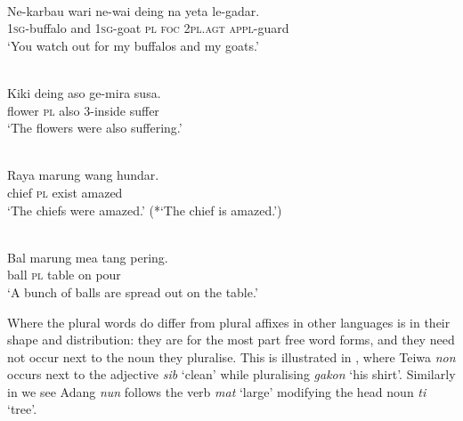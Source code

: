 \ea%
\label{ex:9:4}
 \\
\gll Ne-karbau wari ne-wai deing na yeta le-gadar.{\footnotemark}\\
  \textsc{1sg}\textsc{-}buffalo and \textsc{1sg-}goat \textsc{pl} \textsc{foc} \textsc{2pl.agt} \textsc{appl-}guard\\
\glt `You watch out for my buffalos and my goats.' 
\z
{}







\ea%
\label{ex:9:5}
 \\
\gll Kiki deing aso ge-mira susa. \\
  flower \textsc{pl} also 3-inside suffer  \\
\glt `The flowers were also suffering.'
 \z








\ea%
\label{ex:9:6}
 \\
\gll  Raya marung wang hundar. \\
   chief \textsc{pl} exist amazed  \\
\glt `The chiefs were amazed.' (*`The chief is amazed.')
\z







\ea%
\label{ex:9:7}
 \\
\gll Bal  marung mea tang pering.  \\
  ball \textsc{pl} table on pour   \\
\glt `A bunch of balls are spread out on the table.'
\z







Where the plural words do differ from plural affixes in other languages is in their shape and distribution: they are for the most part free word forms, and they need not occur next to the noun they pluralise. This is illustrated in , where Teiwa \textit{non} occurs next to the adjective \textit{sib} `clean' while pluralising \textit{gakon} `his shirt'. Similarly in  we see Adang \textit{nun} follows the verb \textit{mat}\textit{{\textepsilon}} `large' modifying the head noun \textit{ti} `tree'.


